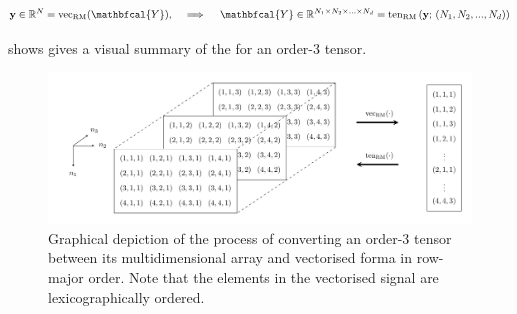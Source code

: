 \begin{align*}
    \y \in \R^{N} = \vecrm{\mathbfcal{Y}}, \quad \implies \quad \mathbfcal{Y} \in \R^{N_1 \times N_2 \times ... \times N_d} =\text{ten}_\text{RM}\left(\y; \, (N_1, N_2, ..., N_d)\right)
\end{align*}

 shows gives a visual summary of the for an order-3 tensor. 


\begin{figure}[t]
    \begin{center}
        \includegraphics[width=\linewidth]{Figures/Tensor_Digaram.pdf}    
    \end{center}
    \caption{Graphical depiction of the process of converting an order-3 tensor between its multidimensional array and vectorised forma in row-major order. Note that the elements in the vectorised signal are lexicographically ordered. }
    \label{fig:ten_to_vec}
\end{figure}



